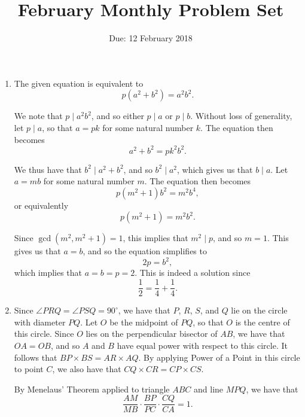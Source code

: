 \documentclass[12pt]{article}
\title{\vspace{-24pt}February Monthly Problem Set}
\author{Due: 12 February 2018}
\date{}
\begin{document}
 \maketitle \pagestyle{empty}

\begin{enumerate}

\item %
The given equation is equivalent to
\[
    p(a^2 + b^2) = a^2 b^2.
\]

We note that $p \mid a^2 b^2$, and so either $p \mid a$ or $p \mid
b$. Without loss of generality, let $p \mid a$, so that $a = pk$ for some
natural number $k$. The equation then becomes
\[
    a^2 + b^2 = pk^2 b^2.
\]

We thus have that $b^2 \mid a^2 + b^2$, and so $b^2 \mid a^2$, which
gives us that $b \mid a$. Let $a = mb$ for some natural number $m$. The
equation then becomes
\[
    p(m^2 + 1) b^2 = m^2 b^4,
\]
or equivalently
\[
    p(m^2 + 1) = m^2 b^2.
\]

Since $\gcd(m^2, m^2 + 1) = 1$, this implies that $m^2 \mid p$, and so $m =
1$. This gives us that $a = b$, and so the equation simplifies to
\[
    2p = b^2,
\]
which implies that $a = b = p = 2$. This is indeed a solution since
\[
    \frac{1}{2} = \frac{1}{4} + \frac{1}{4}.
\]

\item %
Since $\angle PRQ = \angle PSQ = 90^\circ$, we have that $P$, $R$, $S$, and $Q$
lie on the circle with diameter $PQ$. Let $O$ be the midpoint of $PQ$, so that
$O$ is the centre of this circle. Since $O$ lies on the perpendicular bisector
of $AB$, we have that $OA = OB$, and so $A$ and $B$ have equal power with
respect to this circle. It follows that $BP \times BS = AR \times AQ$. By
applying Power of a Point in this circle to point $C$, we also have that $CQ
\times CR = CP \times CS$.

By Menelaus' Theorem applied to triangle $ABC$ and line $MPQ$, we have that
\[
    \frac{AM}{MB} \cdot \frac{BP}{PC} \cdot \frac{CQ}{CA} = 1.
\]


\end{enumerate}
\end{document}
